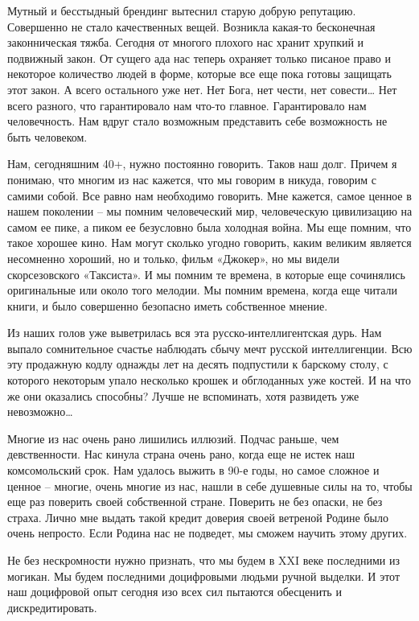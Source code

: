 Мутный и бесстыдный брендинг вытеснил старую добрую репутацию. Совершенно не
стало качественных вещей. Возникла какая-то бесконечная законническая тяжба.
Сегодня от многого плохого нас хранит хрупкий и подвижный закон. От сущего ада
нас теперь охраняет только писаное право и некоторое количество людей в форме,
которые все еще пока готовы защищать этот закон. А всего остального уже нет.
Нет Бога, нет чести, нет совести… Нет всего разного, что гарантировало нам
что-то главное. Гарантировало нам человечность. Нам вдруг стало возможным
представить себе возможность не быть человеком.

Нам, сегодняшним 40+, нужно постоянно говорить. Таков наш долг. Причем я
понимаю, что многим из нас кажется, что мы говорим в никуда, говорим с самими
собой. Все равно нам необходимо говорить. Мне кажется, самое ценное в нашем
поколении – мы помним человеческий мир, человеческую цивилизацию на самом ее
пике, а пиком ее безусловно была холодная война. Мы еще помним, что такое
хорошее кино. Нам могут сколько угодно говорить, каким великим является
несомненно хороший, но и только, фильм «Джокер», но мы видели скорсезовского
«Таксиста». И мы помним те времена, в которые еще сочинялись оригинальные или
около того мелодии. Мы помним времена, когда еще читали книги, и было
совершенно безопасно иметь собственное мнение.

Из наших голов уже выветрилась вся эта русско-интеллигентская дурь. Нам выпало
сомнительное счастье наблюдать сбычу мечт русской интеллигенции. Всю эту
продажную кодлу однажды лет на десять подпустили к барскому столу, с которого
некоторым упало несколько крошек и обглоданных уже костей. И на что же они
оказались способны? Лучше не вспоминать, хотя развидеть уже невозможно…

Многие из нас очень рано лишились иллюзий. Подчас раньше, чем девственности.
Нас кинула страна очень рано, когда еще не истек наш комсомольский срок. Нам
удалось выжить в 90-е годы, но самое сложное и ценное – многие, очень многие из
нас, нашли в себе душевные силы на то, чтобы еще раз поверить своей собственной
стране. Поверить не без опаски, не без страха. Лично мне выдать такой кредит
доверия своей ветреной Родине было очень непросто. Если Родина нас не подведет,
мы сможем научить этому других. 

Не без нескромности нужно признать, что мы будем в XXI веке последними из
могикан. Мы будем последними доцифровыми людьми ручной выделки. И этот наш
доцифровой опыт сегодня изо всех сил пытаются обесценить и дискредитировать.


